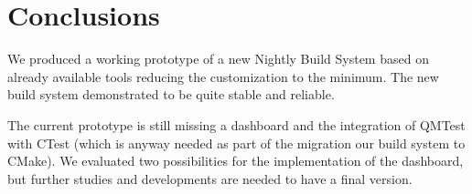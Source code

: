\section{Conclusions}
\label{sec:Conclusion}
We produced a working prototype of a new Nightly Build System based on already
available tools reducing the customization to the minimum.  The new build system
demonstrated to be quite stable and reliable.

The current prototype is still missing a dashboard and the integration of
QMTest with CTest (which is anyway needed as part of the migration our build
system to CMake).  We evaluated two possibilities for the implementation of the
dashboard, but further studies and developments are needed to have a final
version.
